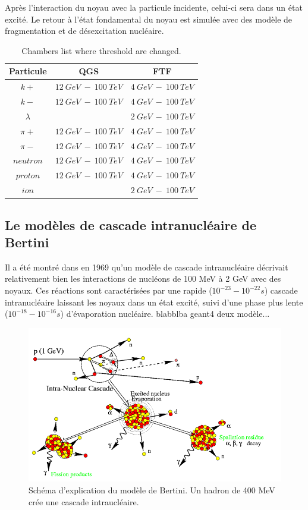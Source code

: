 Après l'interaction du noyau avec la particule incidente, celui-ci sera dans un état excité. Le retour à l'état fondamental du noyau est simulée avec des modèle de fragmentation et de désexcitation nucléaire.
\begin{table}[!ht]
  \begin{center}
    \begin{tabular}{c|c|c}
      Particule & QGS & FTF\\
      \hline
      $k+$ & $12\ GeV\ -\ 100\ TeV$ & $4\ GeV\ -\ 100\ TeV$\\
      $k-$ & $12\ GeV\ -\ 100\ TeV$ & $4\ GeV\ -\ 100\ TeV$\\
      $\lambda$ & $ $ & $2\ GeV\ -\ 100\ TeV$\\
      $\pi+$ & $12\ GeV\ -\ 100\ TeV$ & $4\ GeV\ -\ 100\ TeV$\\
      $\pi-$ & $12\ GeV\ -\ 100\ TeV$ & $4\ GeV\ -\ 100\ TeV$\\
      $neutron$ & $12\ GeV\ -\ 100\ TeV$ & $4\ GeV\ -\ 100\ TeV$\\
      $proton$ & $12\ GeV\ -\ 100\ TeV$ & $4\ GeV\ -\ 100\ TeV$\\
      $ion$ & $ $ & $2\ GeV\ -\ 100\ TeV$\\
    \end{tabular}
  \end{center}
  \caption{Chambers list where threshold are changed.}
  \label{tab.partonModelTable}
\end{table}
\subsection{Le modèles de cascade intranucléaire de Bertini}
\label{sec.inucl}
Il a été montré dans \cite{bertini} en 1969 qu'un modèle de cascade intranucléaire décrivait relativement bien les interactions de nucléons de 100 MeV à 2 GeV avec des noyaux. Ces réactions sont caractérisées par une rapide ($10^{-23}-10^{-22} s$) cascade intranucléaire laissant les noyaux dans un état excité, suivi d'une phase plus lente ($10^{-18}-10^{-16} s$) d'évaporation nucléaire. blabblba geant4 deux modèle...
\begin{figure}[!ht]
  \begin{center}
    \includegraphics[width=.8\textwidth]{Digitizer/figs/intraNucl.png}
    \caption{Schéma d'explication du modèle de Bertini. Un hadron de 400 MeV crée une cascade intraucléaire.}
    \label{fig.g4bertini}
  \end{center}
\end{figure}
